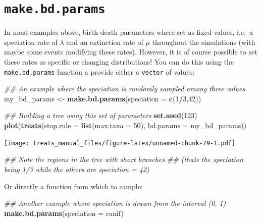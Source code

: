 \documentclass[
]{book}
\newenvironment{Shaded}{\begin{snugshade}}{\end{snugshade}}
\newcommand{\CommentTok}[1]{\textcolor[rgb]{0.56,0.35,0.01}{\textit{#1}}}
\newcommand{\DataTypeTok}[1]{\textcolor[rgb]{0.13,0.29,0.53}{#1}}
\newcommand{\DecValTok}[1]{\textcolor[rgb]{0.00,0.00,0.81}{#1}}
\newcommand{\KeywordTok}[1]{\textcolor[rgb]{0.13,0.29,0.53}{\textbf{#1}}}
\newcommand{\NormalTok}[1]{#1}
\newcommand{\OperatorTok}[1]{\textcolor[rgb]{0.81,0.36,0.00}{\textbf{#1}}}
\newcommand{\StringTok}[1]{\textcolor[rgb]{0.31,0.60,0.02}{#1}}
\begin{document}
\hypertarget{makebdparams}{%
\section{\texorpdfstring{\texttt{make.bd.params}}{make.bd.params}}\label{makebdparams}}

In most examples above, birth-death parameters where set as fixed values, i.e.~a speciation rate of \(\lambda\) and an extinction rate of \(\mu\) throughout the simulations (with maybe some events modifying these rates).
However, it is of course possible to set these rates as specific or changing distributions!
You can do this using the \texttt{make.bd.params} function a provide either a \texttt{vector} of values:

\begin{Shaded}
\begin{Highlighting}[]
\CommentTok{\#\# An example where the speciation is randomly sampled among three values}
\NormalTok{my\_bd\_params \textless{}{-}}\StringTok{ }\KeywordTok{make.bd.params}\NormalTok{(}\DataTypeTok{speciation =} \KeywordTok{c}\NormalTok{(}\DecValTok{1}\OperatorTok{/}\DecValTok{3}\NormalTok{,}\DecValTok{42}\NormalTok{))}

\CommentTok{\#\# Building a tree using this set of parameters}
\KeywordTok{set.seed}\NormalTok{(}\DecValTok{123}\NormalTok{)}
\KeywordTok{plot}\NormalTok{(}\KeywordTok{treats}\NormalTok{(}\DataTypeTok{stop.rule =} \KeywordTok{list}\NormalTok{(}\DataTypeTok{max.taxa =} \DecValTok{50}\NormalTok{), }\DataTypeTok{bd.params =}\NormalTok{ my\_bd\_params))}
\end{Highlighting}
\end{Shaded}

\texttt{[image: treats\_manual\_files/figure-latex/unnamed-chunk-79-1.pdf]}

\begin{Shaded}
\begin{Highlighting}[]
\CommentTok{\#\# Note the regions in the tree with short branches}
\CommentTok{\#\# (that\textquotesingle{}s the speciation being 1/3 while the others are speciation = 42) }
\end{Highlighting}
\end{Shaded}

Or directly a function from which to sample:

\begin{Shaded}
\begin{Highlighting}[]
\CommentTok{\#\# Another example where speciation is drawn from the interval (0, 1)}
\KeywordTok{make.bd.params}\NormalTok{(}\DataTypeTok{speciation =}\NormalTok{ runif)}
\end{Highlighting}
\end{Shaded}
\end{document}
